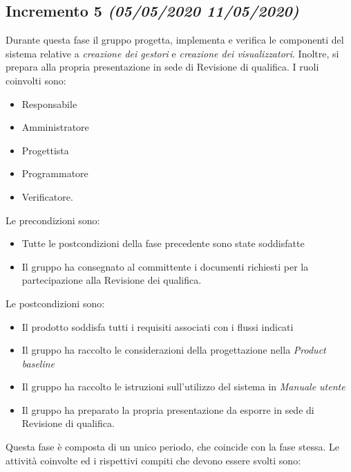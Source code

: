 \documentclass[../piano-di-progetto.tex]{subfiles}
\begin{document}
\subsection[Incremento 5]{Incremento 5 {\normalsize\normalfont\itshape(05/05/2020  11/05/2020)}}%
\label{sub:incremento_5}
Durante questa fase il gruppo progetta, implementa e verifica le componenti del sistema relative a \textit{creazione dei gestori} e \textit{creazione dei visualizzatori}. Inoltre, si prepara alla propria presentazione in sede di Revisione di qualifica.
I ruoli coinvolti sono:
\begin{itemize}
  \item Responsabile
  \item Amministratore
  \item Progettista
  \item Programmatore
  \item Verificatore.
\end{itemize}
Le precondizioni sono:
\begin{itemize}
  \item Tutte le postcondizioni della fase precedente sono state soddisfatte
  \item Il gruppo ha consegnato al committente i documenti richiesti per la partecipazione alla Revisione dei qualifica.
\end{itemize}
Le postcondizioni sono:
\begin{itemize}
  \item Il prodotto soddisfa tutti i requisiti associati con i flussi indicati
  \item Il gruppo ha raccolto le considerazioni della progettazione nella \textit{Product baseline}
  \item Il gruppo ha raccolto le istruzioni sull'utilizzo del sistema in \textit{Manuale utente}
  \item Il gruppo ha preparato la propria presentazione da esporre in sede di Revisione di qualifica.
\end{itemize}
Questa fase è composta di un unico periodo, che coincide con la fase stessa.
Le attività coinvolte ed i rispettivi compiti che devono essere svolti sono:
\end{document}
